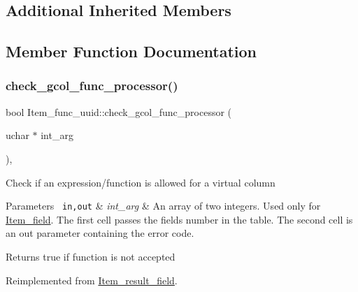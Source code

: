 \subsection*{Additional Inherited Members}


\subsection{Member Function Documentation}
\mbox{\label{classItem__func__uuid_a2ffae007bf0712dd82926ee1a994dc70}} 
\subsubsection{\texorpdfstring{check\+\_\+gcol\+\_\+func\+\_\+processor()}{check\_gcol\_func\_processor()}}
{\footnotesize\ttfamily bool Item\+\_\+func\+\_\+uuid\+::check\+\_\+gcol\+\_\+func\+\_\+processor (\begin{DoxyParamCaption}\item[{uchar $\ast$}]{int\+\_\+arg }\end{DoxyParamCaption})\hspace{0.3cm}{\ttfamily [inline]}, {\ttfamily [virtual]}}

Check if an expression/function is allowed for a virtual column


\begin{DoxyParams}[1]{Parameters}
\mbox{\texttt{ in,out}}  & {\em int\+\_\+arg} & An array of two integers. Used only for \mbox{\hyperlink{classItem__field}{Item\+\_\+field}}. The first cell passes the field\textquotesingle{}s number in the table. The second cell is an out parameter containing the error code.\\
\hline
\end{DoxyParams}
\begin{DoxyReturn}{Returns}
true if function is not accepted 
\end{DoxyReturn}


Reimplemented from \mbox{\hyperlink{classItem__result__field_a12324702e7f419b47de45e3505730441}{Item\+\_\+result\+\_\+field}}.

\mbox{\label{classItem__func__uuid_a004c316cb6e1c0620b1b13d49f5571f7}} 
